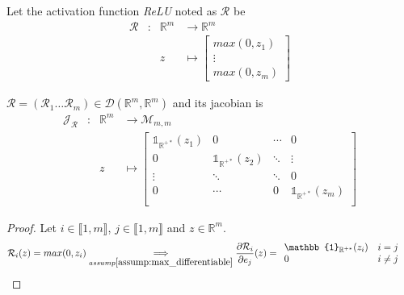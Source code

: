 \documentclass[11pt,en]{elegantpaper}
\newcommand{\Real}{\mathbb{R}}
\begin{document}
\begin{definition}
  Let the activation function \textit{ReLU} noted as $\mathcal{R}$ be
  \begin{equation*}
    \begin{array}{llll}
      \mathcal{R} & : & \Real^m & \longrightarrow \Real^m \\
      &   & z & \longmapsto \begin{bmatrix}
        max(0,z_1) \\
        \vdots \\
        max(0,z_m)
      \end{bmatrix}
    \end{array}
  \end{equation*} \par
\end{definition}

\begin{proposition}
  {\normalfont
    $\mathcal{R} = (\mathcal{R}_1 \ldots \mathcal{R}_m) \in \mathcal{D}(\Real^m,\Real^m)$ and its jacobian is \begin{equation}\label{prop:relu_differential}
      \begin{array}{llll}
        \mathcal{J}_{\mathcal{R}} & : & \Real^m  & \longrightarrow \mathcal{M}_{m,m} \\
        &   & z & \longmapsto \begin{bmatrix}
          \mathbb{1}_{\Real^{+*}}(z_1) & 0 & \cdots & 0 \\
          0 & \mathbb{1}_{\Real^{+*}}(z_2) & \ddots & \vdots \\
          \vdots & \ddots & \ddots & 0 \\
          0 & \cdots & 0 & \mathbb{1}_{\Real^{+*}}(z_m) \\
        \end{bmatrix}
      \end{array}
    \end{equation}
  }
\end{proposition}

\begin{proof}
  Let $i \in \llbracket 1,m \rrbracket$, $j \in \llbracket 1,m \rrbracket$ and $z \in \Real^m$.
  \begin{equation*}
    \begin{split}
      \mathcal{R}_i(z) = max(0,z_i) & \underset{assump\ref{assump:max_differentiable}}\implies \frac{\partial \mathcal{R}_i}{\partial e_j}(z)
        = \begin{array}{ll}
          \mathbb{1}_{\Real^{+*}}(z_i) & i = j \\
          0 & i \neq j
      \end{array}
    \end{split}
  \end{equation*}
\end{proof}
\end{document}
